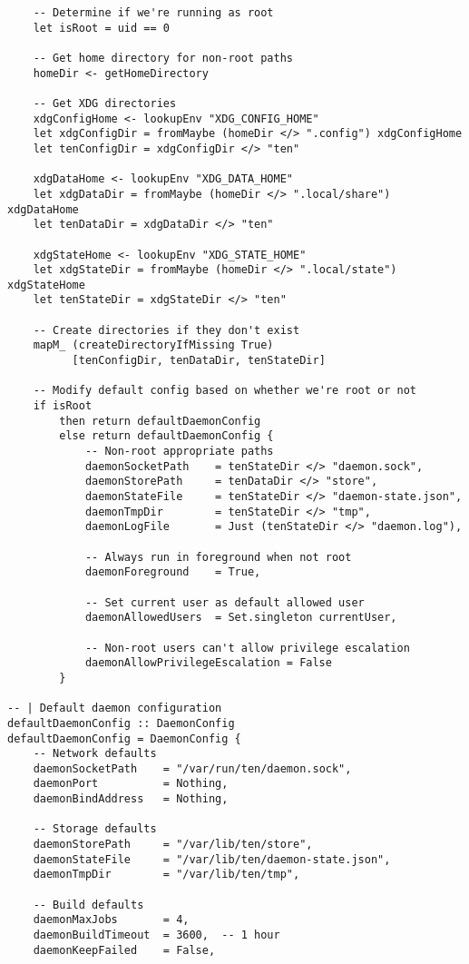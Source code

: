 \documentclass{article}
\begin{document}
\begin{tcolorbox}[title=Ten/Daemon/Config.hs Changes]
\begin{verbatim}
    -- Determine if we're running as root
    let isRoot = uid == 0

    -- Get home directory for non-root paths
    homeDir <- getHomeDirectory

    -- Get XDG directories
    xdgConfigHome <- lookupEnv "XDG_CONFIG_HOME"
    let xdgConfigDir = fromMaybe (homeDir </> ".config") xdgConfigHome
    let tenConfigDir = xdgConfigDir </> "ten"

    xdgDataHome <- lookupEnv "XDG_DATA_HOME"
    let xdgDataDir = fromMaybe (homeDir </> ".local/share") xdgDataHome
    let tenDataDir = xdgDataDir </> "ten"

    xdgStateHome <- lookupEnv "XDG_STATE_HOME"
    let xdgStateDir = fromMaybe (homeDir </> ".local/state") xdgStateHome
    let tenStateDir = xdgStateDir </> "ten"

    -- Create directories if they don't exist
    mapM_ (createDirectoryIfMissing True)
          [tenConfigDir, tenDataDir, tenStateDir]

    -- Modify default config based on whether we're root or not
    if isRoot
        then return defaultDaemonConfig
        else return defaultDaemonConfig {
            -- Non-root appropriate paths
            daemonSocketPath    = tenStateDir </> "daemon.sock",
            daemonStorePath     = tenDataDir </> "store",
            daemonStateFile     = tenStateDir </> "daemon-state.json",
            daemonTmpDir        = tenStateDir </> "tmp",
            daemonLogFile       = Just (tenStateDir </> "daemon.log"),

            -- Always run in foreground when not root
            daemonForeground    = True,

            -- Set current user as default allowed user
            daemonAllowedUsers  = Set.singleton currentUser,

            -- Non-root users can't allow privilege escalation
            daemonAllowPrivilegeEscalation = False
        }

-- | Default daemon configuration
defaultDaemonConfig :: DaemonConfig
defaultDaemonConfig = DaemonConfig {
    -- Network defaults
    daemonSocketPath    = "/var/run/ten/daemon.sock",
    daemonPort          = Nothing,
    daemonBindAddress   = Nothing,

    -- Storage defaults
    daemonStorePath     = "/var/lib/ten/store",
    daemonStateFile     = "/var/lib/ten/daemon-state.json",
    daemonTmpDir        = "/var/lib/ten/tmp",

    -- Build defaults
    daemonMaxJobs       = 4,
    daemonBuildTimeout  = 3600,  -- 1 hour
    daemonKeepFailed    = False,


\end{verbatim}
\end{tcolorbox}
\end{document}
